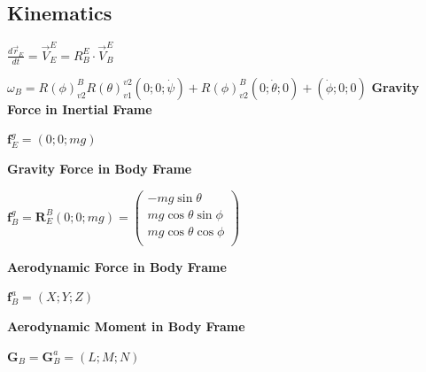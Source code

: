 \documentclass{article}
\begin{document}
\begin{multicols*}{2}
\subsection*{Kinematics}
$\frac{d\vec{r}_E}{dt}=\vec{V}_E^E=R_B^E\cdot\vec{V}_B^E$\par 
$\omega_B=R(\phi)_{v2}^BR(\theta)_{v1}^{v2}(0;0;\dot{\psi})+R(\phi)_{v2}^B(0;\dot{\theta};0)+(\dot{\phi};0;0)$
\textbf{Gravity Force in Inertial Frame}\par 
$\mathbf{f}_E^g=(0;0;mg)$\par 
\textbf{Gravity Force in Body Frame}\par 
$\mathbf{f}_B^g=\mathbf{R}_E^B(0;0;mg)=\begin{pmatrix}
    -mg\sin{\theta}\\
    mg\cos{\theta}\sin{\phi}\\
    mg\cos{\theta}\cos{\phi}\\
\end{pmatrix}$\par
\textbf{Aerodynamic Force in Body Frame}\par 
$\mathbf{f}_B^a=(X;Y;Z)$\par 
\textbf{Aerodynamic Moment in Body Frame}\par 
$\mathbf{G}_B=\mathbf{G}_B^a=(L;M;N)$


\end{multicols*}
\end{document}
